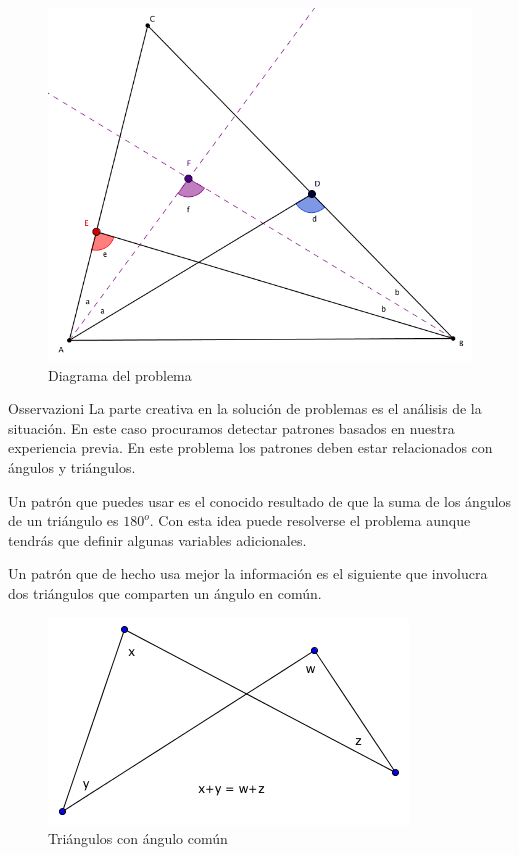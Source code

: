 \documentclass[final]{beamer}
\newlength{\onecolwid}
\begin{document}
\begin{frame}[t]
\begin{columns}[t]
\begin{column}{\onecolwid}
\begin{figure}
\includegraphics[width=0.8\linewidth]{CPIG_0101.png}
\caption{Diagrama del problema}
\end{figure}

\begin{block}{Osservazioni}
La parte creativa en la solución de problemas es el análisis de la situación. En este caso procuramos detectar patrones basados en nuestra experiencia previa.
En este problema los patrones deben estar relacionados con ángulos y triángulos. 

Un patrón que puedes usar es el conocido resultado de que la suma de los ángulos de un triángulo es $180^o$. Con esta idea puede resolverse el problema aunque tendrás que definir algunas variables adicionales. 

Un patrón que de hecho usa mejor la información es el siguiente que involucra dos triángulos que comparten un ángulo en común.
\begin{figure}
\includegraphics[width=0.8\linewidth]{mini_mariposa.png}
\caption{Triángulos con ángulo común}
\end{figure}


\end{block}
\end{column}
\end{columns}
\end{frame}
\end{document}
